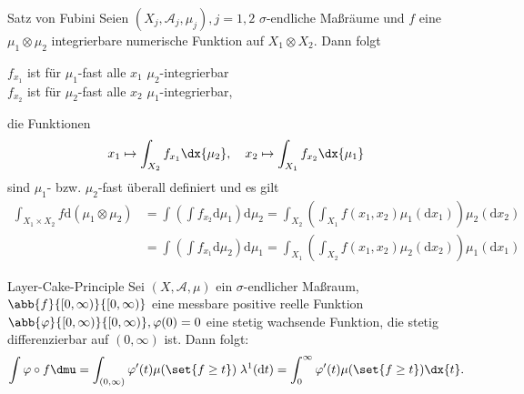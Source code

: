 \begin{karte}{Satz von Fubini}
    Seien \( (X_j, \mathcal{A}_j, \mu_j), j=1,2 \) \(\sigma\)-endliche 
    Maßräume und \(f\) eine \(\mu_1 \otimes \mu_2\) integrierbare numerische 
    Funktion auf \( X_1 \otimes X_2 \). Dann folgt 
    \begin{center}
        \( f_{x_1} \) ist für \( \mu_1 \)-fast alle \(x_1\) \(\mu_2\)-integrierbar\\
        \(f_{x_2}\) ist für \( \mu_2 \)-fast alle \(x_2\) \(\mu_1\)-integrierbar,
    \end{center}
    die Funktionen 
    \[ x_1 \mapsto \int_{X_2} f_{x_1} \dx{\mu_2}, \quad x_2\mapsto \int_{X_1} f_{x_2} \dx{\mu_1} \]
    sind \(\mu_1\)- bzw. \(\mu_2\)-fast überall definiert und es gilt 
    \begin{align*}
        \int_{X_1\times X_2} f \mathrm{d}(\mu_1\otimes\mu_2) &= \int \left( \int f_{x_2}\mathrm{d}\mu_1 \right) \mathrm{d}\mu_2 = \int_{X_2} \left( \int_{X_1} f(x_1, x_2) \mu_1(\mathrm{d}x_1) \right) \mu_2(\mathrm{d}x_2) \\
        &= \int \left(\int f_{x_1} \mathrm{d}\mu_2 \right) \mathrm{d}\mu_1 = \int_{X_1} \left( \int_{X_2} f(x_1, x_2) \mu_2(\mathrm{d}x_2) \right) \mu_1(\mathrm{d}x_1)
    \end{align*}
\end{karte}

\begin{karte}{Layer-Cake-Principle}
    Sei \( (X, \mathcal{A}, \mu) \) ein \(\sigma\)-endlicher Maßraum, 
    \( \abb{f}{[0,\infty)}{[0,\infty)} \) eine messbare 
    positive reelle Funktion \( \abb{\varphi}{[0,\infty)}{[0,\infty)}, \varphi(0)= 0 \)
    eine stetig wachsende Funktion, die stetig differenzierbar auf \((0,\infty)\) ist. 
    Dann folgt: 
    \[ \int \varphi \circ f \dmu = \int_{(0,\infty)} \varphi'(t) \mu(\set{f\geq t}) \;\lambda^1(\mathrm{d}t) 
    = \int_0^\infty \varphi'(t) \mu(\set{f\geq t}) \dx{t}. \]
\end{karte}